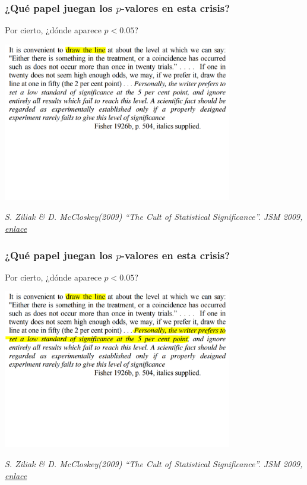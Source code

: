 \documentclass[9pt]{beamer}
\begin{document}
\begin{frame}
  \frametitle{¿Qué papel juegan los $p$-valores en esta crisis?}
  Por cierto, ¿dónde aparece $p < 0.05$?
 \begin{center}
    \includegraphics[width=10cm]{images/fisher_p-value_1.png}
  \end{center}
  \hfill
    {\scriptsize \textit{S. Ziliak \& D. McCloskey(2009) ``The Cult of
        Statistical Significance''. JSM 2009, \href{https://www.deirdremccloskey.com/docs/jsm.pdf}{enlace}}}
\end{frame}


\begin{frame}
  \frametitle{¿Qué papel juegan los $p$-valores en esta crisis?}
  Por cierto, ¿dónde aparece $p < 0.05$?
 \begin{center}
    \includegraphics[width=10cm]{images/fisher_p-value_2.png}
  \end{center}
  \hfill
    {\scriptsize \textit{S. Ziliak \& D. McCloskey(2009) ``The Cult of
        Statistical Significance''. JSM 2009, \href{https://www.deirdremccloskey.com/docs/jsm.pdf}{enlace}}}
\end{frame}
\end{document}
